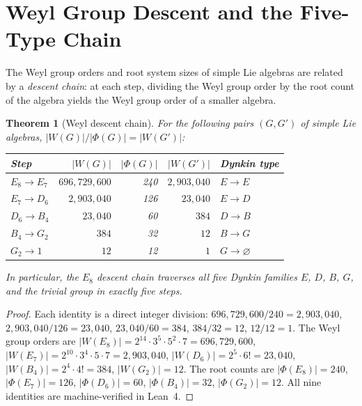 \documentclass[11pt]{amsart}
\theoremstyle{plain}
\newtheorem{theorem}{Theorem}[section]
\theoremstyle{definition}
\theoremstyle{remark}
\renewcommand{\Phi}{\varPhi}
\begin{document}
\section{Weyl Group Descent and the Five-Type Chain}\label{sec:weyl-descent}

The Weyl group orders and root system sizes of simple Lie algebras
are related by a \emph{descent chain}: at each step, dividing the
Weyl group order by the root count of the algebra yields the Weyl
group order of a smaller algebra.

\begin{theorem}[Weyl descent chain]\label{thm:weyl-descent}
For the following pairs $(G, G')$ of simple Lie algebras,
$|W(G)| / |\Phi(G)| = |W(G')|$:
\begin{center}
\renewcommand{\arraystretch}{1.15}
\begin{tabular}{@{}lrrrl@{}}
\toprule
Step & $|W(G)|$ & $|\Phi(G)|$ & $|W(G')|$ & Dynkin type \\
\midrule
$E_8 \to E_7$  & $696{,}729{,}600$ & 240 & $2{,}903{,}040$ & $E \to E$ \\
$E_7 \to D_6$  & $2{,}903{,}040$   & 126 & $23{,}040$      & $E \to D$ \\
$D_6 \to B_4$  & $23{,}040$        & 60  & $384$            & $D \to B$ \\
$B_4 \to G_2$  & $384$             & 32  & $12$             & $B \to G$ \\
$G_2 \to 1$    & $12$              & 12  & $1$              & $G \to \varnothing$ \\
\bottomrule
\end{tabular}
\end{center}
In particular, the $E_8$ descent chain traverses all five Dynkin
families $E$, $D$, $B$, $G$, and the trivial group in exactly five
steps.
\end{theorem}

\begin{proof}
Each identity is a direct integer division:
$696{,}729{,}600 / 240 = 2{,}903{,}040$,
$2{,}903{,}040 / 126 = 23{,}040$,
$23{,}040 / 60 = 384$,
$384 / 32 = 12$,
$12 / 12 = 1$.
The Weyl group orders are
$|W(E_8)| = 2^{14} \cdot 3^5 \cdot 5^2 \cdot 7 = 696{,}729{,}600$,
$|W(E_7)| = 2^{10} \cdot 3^4 \cdot 5 \cdot 7 = 2{,}903{,}040$,
$|W(D_6)| = 2^5 \cdot 6! = 23{,}040$,
$|W(B_4)| = 2^4 \cdot 4! = 384$,
$|W(G_2)| = 12$.
The root counts are $|\Phi(E_8)| = 240$, $|\Phi(E_7)| = 126$,
$|\Phi(D_6)| = 60$, $|\Phi(B_4)| = 32$, $|\Phi(G_2)| = 12$.
All nine identities are machine-verified in Lean~4.
\end{proof}
\end{document}

